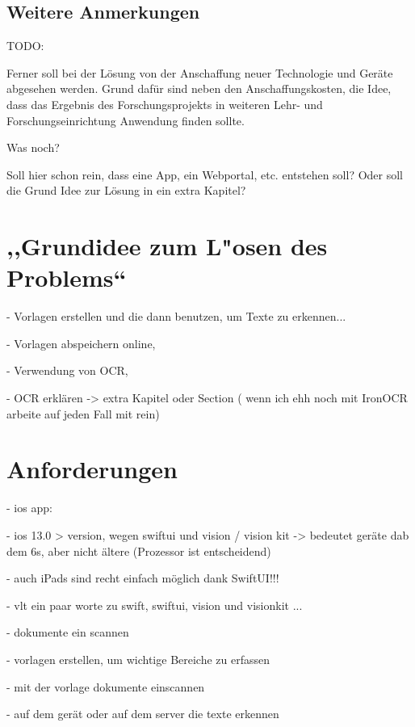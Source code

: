 \documentclass[nomenclature, 150]{HSMW-Thesis}
\begin{document}
	\section{Weitere Anmerkungen}
	TODO:
	
	Ferner soll bei der Lösung von der Anschaffung neuer Technologie und Geräte abgesehen werden. Grund dafür sind neben den Anschaffungskosten, die Idee, dass das Ergebnis des Forschungsprojekts in weiteren Lehr- und Forschungseinrichtung Anwendung finden sollte.
			
	Was noch?
	
	Soll hier schon rein, dass eine App, ein Webportal, etc. entstehen soll? Oder soll die Grund Idee zur Lösung in ein extra Kapitel?





\chapter{ ,,Grundidee zum L"osen des Problems`` }
	- Vorlagen erstellen und die dann benutzen, um Texte zu erkennen...

	- Vorlagen abspeichern online,
	
	- Verwendung von OCR, 
	
	- OCR erklären -> extra Kapitel oder Section ( wenn ich ehh noch mit IronOCR arbeite auf jeden Fall mit rein)





\chapter{Anforderungen}
	- ios app:
	
	- ios 13.0 > version, wegen swiftui und vision / vision kit -> bedeutet geräte dab dem 6s, aber nicht ältere (Prozessor ist entscheidend) 
	
	- auch iPads sind recht einfach möglich dank SwiftUI!!! 
	
	- vlt ein paar worte zu swift, swiftui, vision und visionkit ...
	
	- dokumente ein scannen
	
	- vorlagen erstellen, um wichtige Bereiche zu erfassen
	
	- mit der vorlage dokumente einscannen
	
	- auf dem gerät oder auf dem server die texte erkennen
	
\end{document}
